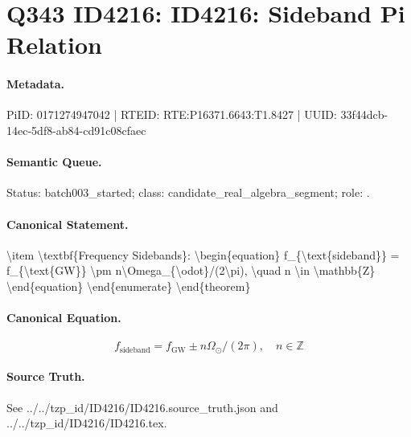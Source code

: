 \section*{Q343 ID4216: ID4216: Sideband Pi Relation}
\paragraph{Metadata.}
PiID: 0171274947042 | RTEID: RTE:P16371.6643:T1.8427 | UUID: 33f44dcb-14ec-5df8-ab84-cd91c08cfaec

\paragraph{Semantic Queue.}
Status: batch003\_started; class: candidate\_real\_algebra\_segment; role: .

\paragraph{Canonical Statement.}
\textbackslash{}item \textbackslash{}textbf\{Frequency Sidebands\}: \textbackslash{}begin\{equation\} f\_\{\textbackslash{}text\{sideband\}\} = f\_\{\textbackslash{}text\{GW\}\} \textbackslash{}pm n\textbackslash{}Omega\_\{\textbackslash{}odot\}/(2\textbackslash{}pi), \textbackslash{}quad n \textbackslash{}in \textbackslash{}mathbb\{Z\} \textbackslash{}end\{equation\} \textbackslash{}end\{enumerate\} \textbackslash{}end\{theorem\}

\paragraph{Canonical Equation.}
\[
\begin{equation} f_{\text{sideband}} = f_{\text{GW}} \pm n\Omega_{\odot}/(2\pi), \quad n \in \mathbb{Z} \end{equation}
\]

\paragraph{Source Truth.}
See ../../tzp\_id/ID4216/ID4216.source\_truth.json and ../../tzp\_id/ID4216/ID4216.tex.
